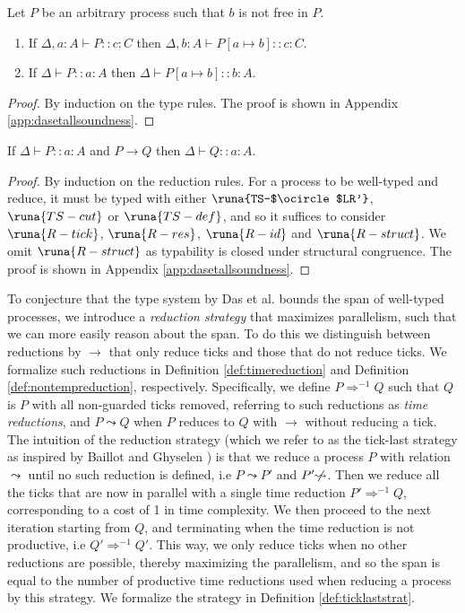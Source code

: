\begin{lemma}\label{lemma:substlem}
Let $P$ be an arbitrary process such that $b$ is not free in $P$. 
\begin{enumerate}
\item If $\Delta,a:A\vdash P :: c\!:\!C$ then $\Delta,b:A\vdash P[a\mapsto b] :: c\!:\!C$.

\item If $\Delta\vdash P :: a\!:\!A$ then $\Delta\vdash P[a\mapsto b] :: b\!:\!A$.
\end{enumerate}
\begin{proof}
By induction on the type rules. The proof is shown in Appendix \ref{app:dasetallsoundness}.
\end{proof}
\end{lemma}

\begin{theorem}
If $\Delta \vdash P :: a\!:\!A$ and $P \longrightarrow Q$ then $\Delta\vdash Q :: a\!:\!A$.
\begin{proof}
By induction on the reduction rules. For a process to be well-typed and reduce, it must be typed with either $\runa{TS-$\ocircle$LR'}$, $\runa{TS-cut}$ or $\runa{TS-def}$, and so it suffices to consider $\runa{R-tick}$, $\runa{R-res}$, $\runa{R-id}$ and $\runa{R-struct}$. We omit $\runa{R-struct}$ as typability is closed under structural congruence. The proof is shown in Appendix \ref{app:dasetallsoundness}.
\end{proof}\label{theorem:sr}
\end{theorem}

To conjecture that the type system by Das et al. \cite{DasEtAl2018} bounds the span of well-typed processes, we introduce a \textit{reduction strategy} that maximizes parallelism, such that we can more easily reason about the span. To do this we distinguish between reductions by $\longrightarrow$ that only reduce ticks and those that do not reduce ticks. We formalize such reductions in Definition \ref{def:timereduction} and Definition \ref{def:nontempreduction}, respectively. Specifically, we define $P\Longrightarrow^{-1} Q$ such that $Q$ is $P$ with all non-guarded ticks removed, referring to such reductions as \textit{time reductions}, and $P\leadsto Q$ when $P$ reduces to $Q$ with $\longrightarrow$ without reducing a tick. The intuition of the reduction strategy (which we refer to as the tick-last strategy as inspired by Baillot and Ghyselen \cite{BaillotGhyselen2021}) is that we reduce a process $P$ with relation $\leadsto$ until no such reduction is defined, i.e $P\leadsto P'$ and $P'\!\not\!\leadsto$. Then we reduce all the ticks that are now in parallel with a single time reduction $P'\Longrightarrow^{-1} Q$, corresponding to a cost of 1 in time complexity. We then proceed to the next iteration starting from $Q$, and terminating when the time reduction is not productive, i.e $Q' \Longrightarrow^{-1} Q'$. This way, we only reduce ticks when no other reductions are possible, thereby maximizing the parallelism, and so the span is equal to the number of productive time reductions used when reducing a process by this strategy. We formalize the strategy in Definition \ref{def:ticklaststrat}.

